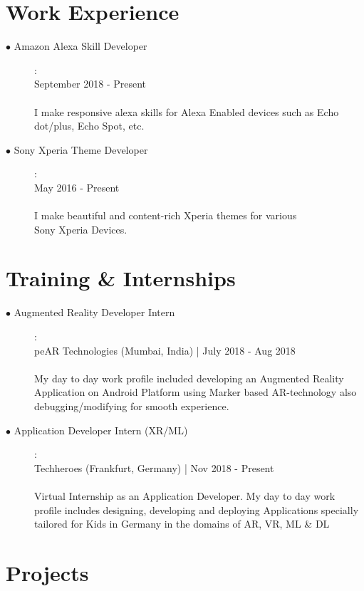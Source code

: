 \documentclass[11pt]{article}
\begin{document}
\section{Work Experience}
\begin{description}
    \item[$\bullet$ Amazon Alexa Skill Developer]:
    \\September 2018 - Present
    \\\\I make responsive alexa skills for Alexa Enabled devices such as Echo dot/plus, Echo Spot, etc.  
    \item[$\bullet$ Sony Xperia Theme Developer]:
    \\May 2016 - Present
    \\\\I make beautiful and content-rich Xperia themes for various \\Sony Xperia Devices.

\end{description}
\section{Training \& Internships}
\begin{description}
    \item[$\bullet$ Augmented Reality Developer Intern]:
    \\peAR Technologies (Mumbai, India) | July 2018 - Aug 2018
    \\\\My day to day work profile included developing an Augmented Reality Application on Android Platform using Marker based AR-technology also debugging/modifying for smooth experience.

    \item[$\bullet$ Application Developer Intern (XR/ML)]:
    \\Techheroes (Frankfurt, Germany) | Nov 2018 - Present
    \\\\Virtual Internship as an Application Developer. My day to day work profile includes designing, developing and deploying Applications specially tailored for Kids in Germany in the domains of AR, VR, ML \& DL

\end{description}

\section{Projects}
\end{document}
